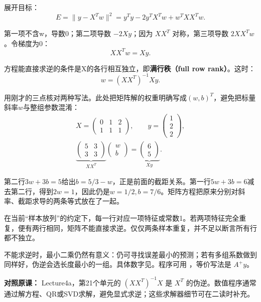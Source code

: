 展开目标：
\[
E=\|y-X^Tw\|^2=y^Ty-2y^TX^Tw+w^TXX^Tw.\tag{4.5}
\]


第一项不含w，导数0；第二项导数 \(-2Xy\)；因为 \(XX^T\) 对称，第三项导数 \(2XX^Tw\)。令梯度为0：
\[
XX^Tw=Xy.\tag{4.6}
\]


方程能直接求逆的条件是X的各行相互独立，即\textbf{满行秩（full row rank）}。这时：
\[
w=(XX^T)^{-1}Xy.\tag{4.7}
\]


用刚才的三点核对两种写法。此处把矩阵解的权重明确写成\((w,b)^T\)，避免把标量斜率\(w\)与整组参数混淆：
\[
\begin{gathered}
X=\begin{pmatrix}0&1&2\\1&1&1\end{pmatrix},\qquad
y=\begin{pmatrix}1\\2\\2\end{pmatrix},\\[4pt]
\underbrace{\begin{pmatrix}5&3\\3&3\end{pmatrix}}_{XX^T}
\begin{pmatrix}w\\b\end{pmatrix}
=\underbrace{\begin{pmatrix}6\\5\end{pmatrix}}_{Xy}.
\end{gathered}\tag{4.7a}
\]


第二行\(3w+3b=5\)给出\(b=5/3-w\)，正是前面的截距关系。第一行\(5w+3b=6\)减去第二行，得到\(2w=1\)，因此仍是\(w=1/2,b=7/6\)。矩阵方程把原来分别对斜率、截距求导的两条等式放在了一起。


在当前“样本放列”的约定下，每一行对应一项特征或常数1。若两项特征完全重复，便有两行相同，矩阵不能直接求逆。仅仅两条样本重复，并不足以断言所有行都不独立。


不能求逆时，最小二乘仍然有意义：仍可寻找误差最小的预测；若有多组系数做到同样好，伪逆会选长度最小的一组。具体数字见。程序可用 ，等价写法是 \(A^+y\)。


\textbf{对照原课：} Lecture4a，第21个单元的 \((XX^T)^{-1}X\) 是 \(X^T\) 的伪逆。数值程序通常通过解方程、QR或SVD求解，避免显式求逆；这些求解器细节可在二读时补充。


